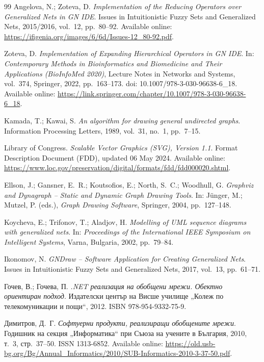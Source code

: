 \begin{thebibliography}{99}
Angelova, N.; Zoteva, D.
\newblock \emph{Implementation of the Reducing Operators over Generalized Nets in GN IDE}.
\newblock Issues in Intuitionistic Fuzzy Sets and Generalized Nets, 2015/2016, vol.~12, pp.~80--92.
\newblock Available online: \url{https://ifigenia.org/images/6/6d/Issues-12_80-92.pdf}.

Zoteva, D.
\newblock \emph{Implementation of Expanding Hierarchical Operators in GN IDE}.
\newblock In: \emph{Contemporary Methods in Bioinformatics and Biomedicine and Their Applications (BioInfoMed 2020)},
Lecture Notes in Networks and Systems, vol.~374, Springer, 2022, pp.~163--173.
\newblock doi: 10.1007/978-3-030-96638-6\_18.
\newblock Available online: \url{https://link.springer.com/chapter/10.1007/978-3-030-96638-6_18}.

Kamada, T.; Kawai, S.
\newblock \emph{An algorithm for drawing general undirected graphs}.
\newblock Information Processing Letters, 1989, vol.~31, no.~1, pp.~7--15.

Library of Congress.
\newblock \emph{Scalable Vector Graphics (SVG), Version 1.1}.
\newblock Format Description Document (FDD), updated 06 May 2024.
\newblock Available online: \url{https://www.loc.gov/preservation/digital/formats/fdd/fdd000020.shtml}.

Ellson, J.; Gansner, E.~R.; Koutsofios, E.; North, S.~C.; Woodhull, G.
\newblock \emph{Graphviz and Dynagraph -- Static and Dynamic Graph Drawing Tools}.
\newblock In: J{\"u}nger, M.; Mutzel, P. (eds.), \emph{Graph Drawing Software}, Springer, 2004, pp.~127--148.

Koycheva, E.; Trifonov, T.; Aladjov, H.
\newblock \emph{Modelling of UML sequence diagrams with generalized nets}.
\newblock In: \emph{Proceedings of the International IEEE Symposium on Intelligent Systems}, Varna, Bulgaria, 2002, pp.~79--84.

Ikonomov, N.
\newblock \emph{GNDraw -- Software Application for Creating Generalized Nets}.
\newblock Issues in Intuitionistic Fuzzy Sets and Generalized Nets, 2017, vol.~13, pp.~61--71.

Гочев, В.; Гочева, П.
\newblock \emph{.NET реализация на обобщени мрежи. Обектно ориентиран подход}.
\newblock Издателски център на Висше училище „Колеж по телекомуникации и пощи“, 2012.
\newblock ISBN 978-954-9332-75-9.

Димитров, Д.~Г.
\newblock \emph{Софтуерни продукти, реализиращи обобщените мрежи}.
\newblock Годишник на секция „Информатика“ при Съюза на учените в България, 2010, т.~3, стр.~37--50.
\newblock ISSN 1313-6852.
\newblock Available online: \url{https://old.usb-bg.org/Bg/Annual_Informatics/2010/SUB-Informatics-2010-3-37-50.pdf}.


\end{thebibliography}
